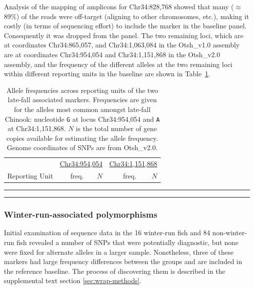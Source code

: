 Analysis of the mapping of amplicons for Chr34:828,768
showed that many ($\approx$89\%) of the reads were off-target (aligning to other chromosomes,
etc.), making it costly (in terms of sequencing effort) to include the marker in the baseline panel.
Consequently it was dropped from the panel.  The two remaining loci, which are at coordinates
Chr34:865,057, and Chr34:1,063,084 in the Otsh\_v1.0 assembly are at coordinates
Chr34:954,054 and  Chr34:1,151,868 in the Otsh\_v2.0 assembly, and
the frequency of the different alleles at the two remaining loci
within different reporting units in the baseline are shown in Table~\ref{tab:lfar-freqs}.
\begin{table}
\caption{\footnotesize Allele frequencies across reporting units of the two late-fall associated
markers.  Frequencies are given for the alleles most common amongst late-fall Chinook: nucleotide
{\tt G} at locus Chr34:954,054 and {\tt A} at Chr34:1,151,868.  $N$ is the total number of gene
copies available for estimating the allele frequency. Genome coordinates of SNPs are from Otsh\_v2.0.}
\label{tab:lfar-freqs}
{\footnotesize
\begin{tabular*}{0.48\textwidth}{@{\extracolsep{\fill}} lrrrr}
\hline\hline
& \multicolumn{2}{c}{\underline{Chr34:954,054}} & \multicolumn{2}{c}{\underline{Chr34:1,151,868}} \\
Reporting Unit & freq. & $N$ & freq. & $N$ \\ \hline

\end{tabular*}
}
\par\vspace*{-2.2ex}\noindent\rule{0.48\textwidth}{0.5pt}
\par\vspace*{-2.4ex}\noindent\rule{0.48\textwidth}{0.5pt}
\end{table}

\subsubsection*{Winter-run-associated polymorphisms}

Initial examination of sequence data 
in the 16 winter-run fish and 84 non-winter-run fish revealed
a number of SNPs that were potentially diagnostic, but none were fixed for alternate alleles 
in a larger sample.
Nonetheless, three of these markers had large frequency differences
between the groups and are included in the reference baseline.  The process of 
discovering them is described in the supplemental text section \ref{sec:wrap-methods}.

